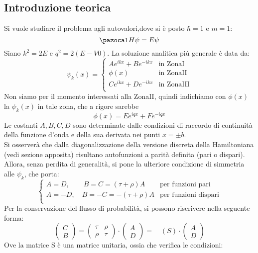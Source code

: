 \subsection*{Introduzione teorica}

Si vuole studiare il problema agli autovalori,dove si è posto $\hbar = 1$ e $m = 1$:
$$ \Hh\psi = E \psi $$
%
Siano $k^2 = 2E$ e  $q^2 = 2(E-V0)$. La soluzione analitica più generale è data da:
%
$$
\psi_k(x) =
    \begin{cases}
        Ae^{ikx}+Be^{-ikx} & \mbox{in ZonaI} \\
        \phi(x) & \mbox{in ZonaII} \\
        Ce^{ikx}+De^{-ikx} & \mbox{in ZonaIII} \\
    \end{cases}
$$
%
\bigskip
Non siamo per il momento interessati alla ZonaII, quindi indichiamo con
$\phi(x)$ la $\psi_k(x)$ in tale zona, che a rigore sarebbe
    $$\phi(x)= Ee^{iqx}+Fe^{-iqx}$$
Le costanti $A,B,C,D$ sono determinate dalle condizioni di raccordo di continuità della
funzione d'onda e della sua derivata nei punti $x=\pm b$.\\
Si osserverà che dalla diagonalizzazione della versione discreta della Hamiltoniana
(vedi sezione apposita) risultano autofunzioni a parità definita (pari o dispari).
Allora, senza perdita di generalità, si pone la ulteriore condizione di simmetria alle $\psi_k$, che porta:
$$\begin{cases}
    A = D, \qquad  B = C = (\tau + \rho)A &\mbox{per funzioni pari} \\
    A = -D, \quad B = -C = -(\tau + \rho)A &\mbox{per funzioni dispari}\\
\end{cases}$$
Per la conservazione del flusso di probabilità, si possono riscrivere nella seguente forma:
$$
    \begin{pmatrix} C \\ B \end{pmatrix} =
    \begin{pmatrix} \tau & \rho \\ \rho & \tau \end{pmatrix} \cdot
    \begin{pmatrix} A \\ D \end{pmatrix} = \quad (S)\cdot \begin{pmatrix} A \\ D \end{pmatrix}
$$
Ove la matrice S è una matrice unitaria, ossia che verifica le condizioni:

